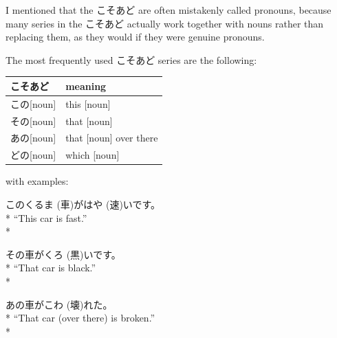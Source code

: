 \documentclass[11pt, b5paper, twoside, openright, onecolumn]{book}
\makeatletter
\newcommand*{\rubystack}[2]{{\relscale{0.5}%
  \begin{tabular}[b]{@{}c@{}}%
    {#1}\\%
   {\textscale{2}{#2}}%
  \end{tabular}}%
}
\DeclareRobustCommand*{\ruby}[2]{%
  \mbox{%
    \setlength{\parskip}{0ex}%
    \BeginAccSupp{method=pdfstringdef,ActualText={#1}}%
      \rubystack{\phantom{#2}}{#1}%
      \llap{%
        \rubystack{#2}{\phantom{#1}}%
      }%
    \EndAccSupp{}%
  }%
}
\renewcommand*{\ruby}[2]{#2 (#1)}%
\newenvironment{exampleblock}{
\setlength{\parindent}{0.6in}
\begin{minipage}[t]{\dimexpr\textwidth-\parindent}}
{\end{minipage}}
\newenvironment{mytabularcentered}[1]{\noindent
\begin{center}\begin{tabular}[h]{#1}}{\end{tabular}\end{center}}
\makeatother
\begin{document}
I mentioned that the こそあど are often mistakenly called pronouns‚ because many series in the こそあど actually work together with nouns rather than replacing them‚ as they would if they were genuine pronouns.

The most frequently used こそあど series are the following:

\vspace{0.5cm}
\smaller
\begin{center}
\begin{mytabularcentered}{| l  l |}\hline 
\rule{0pt}{2.4ex}こそあど & meaning\\ 
\hline
\rule{0pt}{2.4ex}\index[japanese]{この}この[noun] & \index[english]{This!(noun)}this [noun]\\ 
\rule{0pt}{2.4ex}\index[japanese]{その}その[noun] & \index[english]{That!(noun)}that [noun]\\ 
\rule{0pt}{2.4ex}\index[japanese]{あの}あの[noun] & that [noun] over there\\ 
\rule{0pt}{2.4ex}\index[japanese]{どの}どの[noun] & \index[english]{Which!(noun)}which [noun]\\ 
\hline 
\end{mytabularcentered}
\end{center}
\larger
\vspace{0.5cm}


with examples:

\vspace{0.4cm}
\begin{exampleblock}
この\ruby{車}{くるま}が\ruby{速}{はや}いです。 \\* 
“This car is fast.” \\* 
\end{exampleblock}
\vspace{0.2cm}

\begin{exampleblock}
その車が\ruby{黒}{くろ}いです。 \\* 
“That car is black.” \\* 
\end{exampleblock}
\vspace{0.2cm}

\begin{exampleblock}
あの車が\ruby{壊}{こわ}れた。 \\* 
“That car (over there) is broken.” \\* 
\end{exampleblock}
\vspace{0.2cm}
\end{document}
